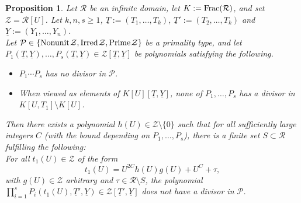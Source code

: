 \documentclass[11pt,a4paper,reqno]{amsart}
\newtheorem{prop}[thm]{Proposition}
\theoremstyle{definition}
\begin{document}
\begin{prop} \label{prop:R[U]-loc-Schinzel-ring}
Let $\mathcal R$ be an infinite domain, let $K:=\textrm{\rm Frac}(\mathcal{R})$, and set $\mathcal{Z} = \mathcal{R}[U]$. 
Let $k,n,s\ge 1$, $\underline{T} := (T_1,\dots, T_k)$,
$\underline T':=(T_2,\dots, T_k)$ and $\underline Y:=(Y_1,\dots, Y_n)$.\\
Let $\mathcal{P}\in \{\rm{Nonunit}\hskip 1pt \mathcal{Z}, \rm{Irred} \hskip 1pt \mathcal{Z}, \rm{Prime} \hskip 1pt \mathcal{Z}\}$ be a primality type, and let $P_1(\underline T, \underline Y), \dots, P_s(\underline T,\underline Y) \in {\mathcal Z}[\underline T,\underline Y]$ be polynomials satisfying the following.
\begin{itemize}
\item[i)] $P_1\cdots P_s$ has no divisor in $\mathcal{P}$.
\item[ii)] When viewed as elements of $K[U][\underline{T}, \underline{Y}]$, none of $P_1,\dots, P_s$ has a divisor in $K[U,T_1]\setminus K[U]$.
\end{itemize}

Then there exists a polynomial $h(U)\in \mathcal{Z}\setminus\{0\}$ such that for all sufficiently large integers $C$ (with the bound depending on $P_1,\dots, P_s$), there is a finite set $S\subset\mathcal{R}$ fulfilling the following:\\
For all $t_1(U)\in \mathcal{Z}$ of the form 
$$t_1(U)  = U^{2C} h(U) g(U) + U^C + \tau,$$
with $g(U)\in \mathcal{Z}$ arbitrary and $\tau\in \mathcal{R}\setminus S$, the polynomial
$\prod_{i=1}^s P_i(t_1(U),\underline T', \underline Y)\in \mathcal{Z}[\underline T', \underline Y]$ does not have a divisor in $\mathcal{P}$.
\end{prop}
\end{document}
